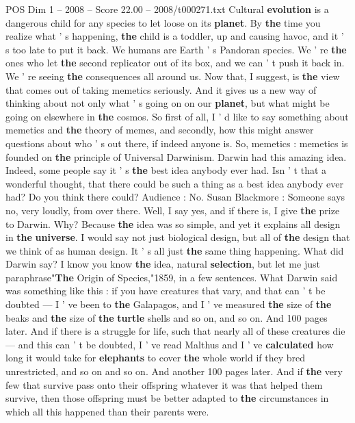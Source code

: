 \begin{textsample}{POS Dim 1 – 2008 – Score 22.00 – 2008/t000271.txt}  \label{ex:f1_pos_009}
Cultural \textbf{evolution} is a dangerous child for any species to let loose on its \textbf{planet}.
By \textbf{the} time you realize what ' s happening, \textbf{the} child is a toddler, up and causing havoc, and it ' s too late to put it back.
We humans are Earth ' s Pandoran species.
We ' re \textbf{the} ones who let \textbf{the} second replicator out of its box, and we can ' t push it back in.
We ' re seeing \textbf{the} consequences all around us.
Now that, I suggest, is \textbf{the} view that comes out of taking memetics seriously.
And it gives us a new way of thinking about not only what ' s going on on our \textbf{planet}, but what might be going on elsewhere in \textbf{the} cosmos.
So first of all, I ' d like to say something about memetics and \textbf{the} theory of memes, and secondly, how this might answer questions about who ' s out there, if indeed anyone is.
So, memetics : memetics is founded on \textbf{the} principle of Universal Darwinism.
Darwin had this amazing idea.
Indeed, some people say it ' s \textbf{the} best idea anybody ever had.
Isn ' t that a wonderful thought, that there could be such a thing as a best idea anybody ever had?
Do you think there could?
Audience : No.
Susan Blackmore : Someone says no, very loudly, from over there.
Well, I say yes, and if there is, I give \textbf{the} prize to Darwin.
Why?
Because \textbf{the} idea was so simple, and yet it explains all design in \textbf{the} \textbf{universe}.
I would say not just biological design, but all of \textbf{the} design that we think of as human design.
It ' s all just \textbf{the} same thing happening.
What did Darwin say?
I know you know \textbf{the} idea, natural \textbf{selection}, but let me just paraphrase"\textbf{The} Origin of Species,"1859, in a few sentences.
What Darwin said was something like this : if you have creatures that vary, and that can ' t be doubted — I ' ve been to \textbf{the} Galapagos, and I ' ve measured \textbf{the} size of \textbf{the} beaks and \textbf{the} size of \textbf{the} \textbf{turtle} shells and so on, and so on.
And 100 pages later.
And if there is a struggle for life, such that nearly all of these creatures die — and this can ' t be doubted, I ' ve read Malthus and I ' ve \textbf{calculated} how long it would take for \textbf{elephants} to cover \textbf{the} whole world if they bred unrestricted, and so on and so on.
And another 100 pages later.
And if \textbf{the} very few that survive pass onto their offspring whatever it was that helped them survive, then those offspring must be better adapted to \textbf{the} circumstances in which all this happened than their parents were.

\end{textsample}
